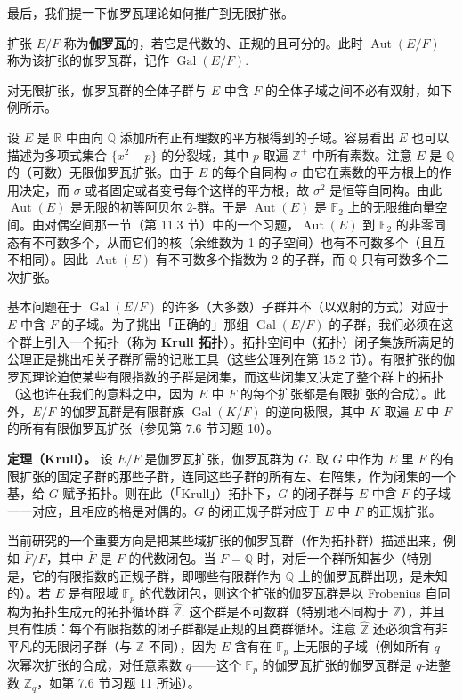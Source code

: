 最后，我们提一下伽罗瓦理论如何推广到无限扩张。

\begin{definition}
扩张 \(E/F\) 称为\textbf{伽罗瓦}的，若它是代数的、正规的且可分的。此时 \(\operatorname{Aut}(E/F)\) 称为该扩张的伽罗瓦群，记作 \(\operatorname{Gal}(E/F)\).
\end{definition}

对无限扩张，伽罗瓦群的全体子群与 \(E\) 中含 \(F\) 的全体子域之间不必有双射，如下例所示。

设 \(E\) 是 \(\mathbb{R}\) 中由向 \(\mathbb{Q}\) 添加所有正有理数的平方根得到的子域。容易看出 \(E\) 也可以描述为多项式集合 \(\{x^2-p\}\) 的分裂域，其中 \(p\) 取遍 \(\mathbb{Z}^+\) 中所有素数。注意 \(E\) 是 \(\mathbb{Q}\) 的（可数）无限伽罗瓦扩张。由于 \(E\) 的每个自同构 \(\sigma\) 由它在素数的平方根上的作用决定，而 \(\sigma\) 或者固定或者变号每个这样的平方根，故 \(\sigma^2\) 是恒等自同构。由此 \(\operatorname{Aut}(E)\) 是无限的初等阿贝尔 2-群。于是 \(\operatorname{Aut}(E)\) 是 \(\mathbb{F}_2\) 上的无限维向量空间。由对偶空间那一节（第 11.3 节）中的一个习题，\(\operatorname{Aut}(E)\) 到 \(\mathbb{F}_2\) 的非零同态有不可数多个，从而它们的核（余维数为 1 的子空间）也有不可数多个（且互不相同）。因此 \(\operatorname{Aut}(E)\) 有不可数多个指数为 2 的子群，而 \(\mathbb{Q}\) 只有可数多个二次扩张。

基本问题在于 \(\operatorname{Gal}(E/F)\) 的许多（大多数）子群并不（以双射的方式）对应于 \(E\) 中含 \(F\) 的子域。为了挑出「正确的」那组 \(\operatorname{Gal}(E/F)\) 的子群，我们必须在这个群上引入一个拓扑（称为 \textbf{Krull 拓扑}）。拓扑空间中（拓扑）闭子集族所满足的公理正是挑出相关子群所需的记账工具（这些公理列在第 15.2 节）。有限扩张的伽罗瓦理论迫使某些有限指数的子群是闭集，而这些闭集又决定了整个群上的拓扑（这也许在我们的意料之中，因为 \(E\) 中 \(F\) 的每个扩张都是有限扩张的合成）。此外，\(E/F\) 的伽罗瓦群是有限群族 \(\operatorname{Gal}(K/F)\) 的逆向极限，其中 \(K\) 取遍 \(E\) 中 \(F\) 的所有有限伽罗瓦扩张（参见第 7.6 节习题 10）。

\noindent\textbf{定理（Krull）。} 设 \(E/F\) 是伽罗瓦扩张，伽罗瓦群为 \(G\). 取 \(G\) 中作为 \(E\) 里 \(F\) 的有限扩张的固定子群的那些子群，连同这些子群的所有左、右陪集，作为闭集的一个基，给 \(G\) 赋予拓扑。则在此（「Krull」）拓扑下，\(G\) 的闭子群与 \(E\) 中含 \(F\) 的子域一一对应，且相应的格是对偶的。\(G\) 的闭正规子群对应于 \(E\) 中 \(F\) 的正规扩张。

当前研究的一个重要方向是把某些域扩张的伽罗瓦群（作为拓扑群）描述出来，例如 \(\bar F/F\)，其中 \(\bar F\) 是 \(F\) 的代数闭包。当 \(F = \mathbb{Q}\) 时，对后一个群所知甚少（特别是，它的有限指数的正规子群，即哪些有限群作为 \(\mathbb{Q}\) 上的伽罗瓦群出现，是未知的）。若 \(E\) 是有限域 \(\mathbb{F}_p\) 的代数闭包，则这个扩张的伽罗瓦群是以 Frobenius 自同构为拓扑生成元的拓扑循环群 \(\hat{\mathbb{Z}}\). 这个群是不可数群（特别地不同构于 \(\mathbb{Z}\)），并且具有性质：每个有限指数的闭子群都是正规的且商群循环。注意 \(\hat{\mathbb{Z}}\) 还必须含有非平凡的无限闭子群（与 \(\mathbb{Z}\) 不同），因为 \(E\) 含有在 \(\mathbb{F}_p\) 上无限的子域（例如所有 \(q\) 次幂次扩张的合成，对任意素数 \(q\)——这个 \(\mathbb{F}_p\) 的伽罗瓦扩张的伽罗瓦群是 \(q\)-进整数 \(\mathbb{Z}_q\)，如第 7.6 节习题 11 所述）。

